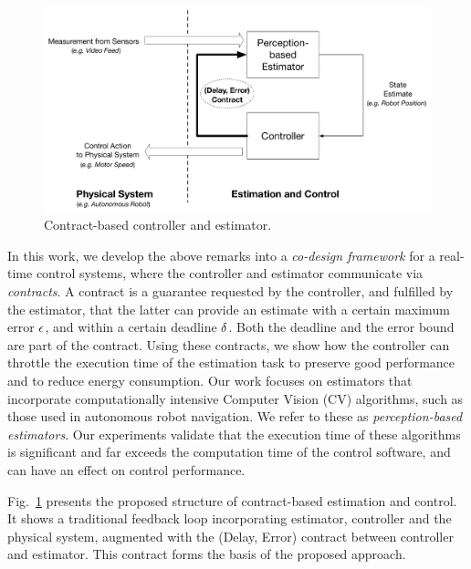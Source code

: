 \begin{figure}[t]
	\centering
	
	\includegraphics[scale=0.3]{figures/omnigraffle_figures/high_level_figure.pdf}
	\vspace{-10pt}
	\caption{Contract-based controller and estimator.}
	\label{fig:codesignedCE}
	\vspace{-20pt}
\end{figure}



In this work, we develop the above remarks into a \emph{co-design framework} for a real-time control systems, where the controller and estimator communicate via \emph{contracts}.
A contract is a guarantee requested by the controller, and fulfilled by the estimator, that the latter can provide an estimate with a certain maximum error $\epsilon$, and within a certain deadline $\delta$.
Both the deadline and the error bound are part of the contract.
Using these contracts, we show how the controller can throttle the execution time of the estimation task to preserve good performance and to reduce energy consumption.
Our work focuses on estimators that incorporate computationally intensive Computer Vision (CV) algorithms, such as those used in autonomous robot navigation. 
We refer to these as \emph{perception-based estimators}.
Our experiments validate that the execution time of these algorithms is significant and far exceeds the computation time of the control software, and can have an effect on control performance.

Fig.~\ref{fig:codesignedCE} presents the proposed structure of contract-based estimation and control.
It shows a traditional feedback loop incorporating estimator, controller and the physical system, augmented with the (Delay, Error) contract between controller and estimator.
This contract forms the basis of the proposed approach.

